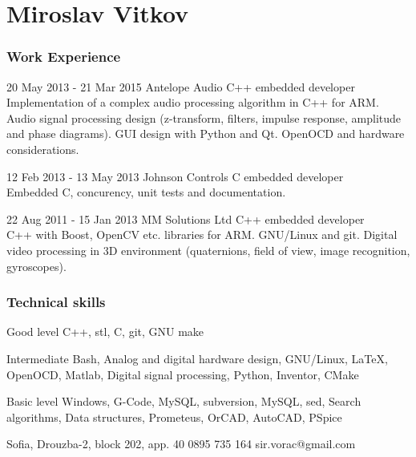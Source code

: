 \documentclass{tccv}
\begin{document}
\part{Miroslav Vitkov}


\section{Work Experience}
\begin{eventlist}
\item{20 May 2013 - 21 Mar 2015}
     {Antelope Audio}
     {C++ embedded developer} \\
Implementation of a complex audio processing algorithm in C++ for ARM.
Audio signal processing design (z-transform, filters, impulse response, amplitude and phase diagrams).
GUI design with Python and Qt.
OpenOCD and hardware considerations.

\item{12 Feb 2013 - 13 May 2013}
     {Johnson Controls}
     {C embedded developer} \\
Embedded C, concurency, unit tests and documentation.

\item{22 Aug 2011 - 15 Jan 2013}
     {MM Solutions Ltd}
     {C++ embedded developer} \\

C++ with Boost, OpenCV etc. libraries for ARM.
GNU/Linux and git.
Digital video processing in 3D environment (quaternions, field of view, image recognition, gyroscopes).
\end{eventlist}


\section{Technical skills}
\begin{factlist}
\item{Good level}
     {C++, stl, C, git, GNU make}

\item{Intermediate}
     {Bash, Analog and digital hardware design, GNU/Linux, LaTeX, OpenOCD, Matlab, Digital signal processing, Python, Inventor, CMake}

\item{Basic level}
     {Windows, G-Code, MySQL, subversion, MySQL, sed, Search algorithms, Data structures, Prometeus, OrCAD, AutoCAD, PSpice}
\end{factlist}


\personal
    {Sofia, Drouzba-2, block 202, app. 40}
    {0895 735 164}
    {sir.vorac@gmail.com}
\end{document}
